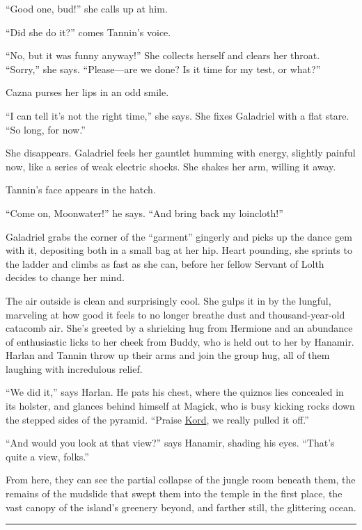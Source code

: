 \documentclass[smalldemyvopaper,11pt,twoside,onecolumn,openright,extrafontsizes]{memoir}
\begin{document}
``Good one, bud!'' she calls up at him.

``Did she do it?'' comes Tannin's voice.

``No, but it was funny anyway!'' She collects herself and clears her
throat. ``Sorry,'' she says. ``Please---are we done? Is it time for my
test, or what?''

Cazna purses her lips in an odd smile.

``I can tell it's not the right time,'' she says. She fixes Galadriel
with a flat stare. ``So long, for now.''

She disappears. Galadriel feels her gauntlet humming with energy,
slightly painful now, like a series of weak electric shocks. She shakes
her arm, willing it away.

Tannin's face appears in the hatch.

``Come on, Moonwater!'' he says. ``And bring back my loincloth!''

Galadriel grabs the corner of the ``garment'' gingerly and picks up the
dance gem with it, depositing both in a small bag at her hip. Heart
pounding, she sprints to the ladder and climbs as fast as she can,
before her fellow Servant of Lolth decides to change her mind.

The air outside is clean and surprisingly cool. She gulps it in by the
lungful, marveling at how good it feels to no longer breathe dust and
thousand-year-old catacomb air. She's greeted by a shrieking hug from
Hermione and an abundance of enthusiastic licks to her cheek from Buddy,
who is held out to her by Hanamir. Harlan and Tannin throw up their arms
and join the group hug, all of them laughing with incredulous relief.

``We did it,'' says Harlan. He pats his chest, where the quiznos lies
concealed in its holster, and glances behind himself at Magick, who is
busy kicking rocks down the stepped sides of the pyramid. ``Praise
\href{/characters/kord/}{Kord}, we really pulled it off.''

``And would you look at that view?'' says Hanamir, shading his eyes.
``That's quite a view, folks.''

From here, they can see the partial collapse of the jungle room beneath
them, the remains of the mudslide that swept them into the temple in the
first place, the vast canopy of the island's greenery beyond, and
farther still, the glittering ocean.

\begin{center}\rule{0.5\linewidth}{\linethickness}\end{center}
\end{document}

